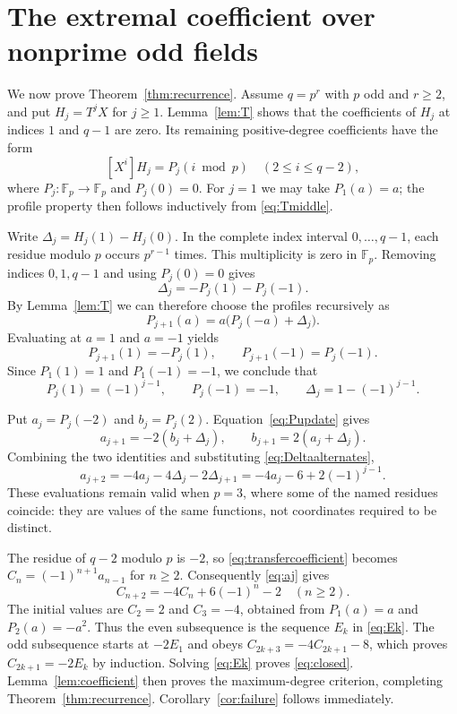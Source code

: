 \documentclass[11pt]{article}
\theoremstyle{remark}\newtheorem{remark}[theorem]{Remark}
\newcommand{\F}{\mathbb F}
\begin{document}
\section{The extremal coefficient over nonprime odd fields}

We now prove Theorem~\ref{thm:recurrence}. Assume $q=p^r$ with $p$ odd and
$r\geq2$, and put $H_j=T^jX$ for $j\geq1$.
Lemma~\ref{lem:T} shows that the coefficients of $H_j$ at indices $1$ and
$q-1$ are zero. Its remaining positive-degree coefficients have the form
\begin{equation}\label{eq:profile}
 [X^i]H_j=P_j(i\bmod p)\quad(2\leq i\leq q-2),
\end{equation}
where $P_j:\F_p\to\F_p$ and $P_j(0)=0$. For $j=1$ we may take $P_1(a)=a$;
the profile property then follows inductively from \eqref{eq:Tmiddle}.

Write $\Delta_j=H_j(1)-H_j(0)$. In the complete index interval
$0,\ldots,q-1$, each residue modulo $p$ occurs $p^{r-1}$ times. This multiplicity
is zero in $\F_p$. Removing indices $0,1,q-1$ and using $P_j(0)=0$ gives
\begin{equation}\label{eq:Deltaj}
 \Delta_j=-P_j(1)-P_j(-1).
\end{equation}
By Lemma~\ref{lem:T} we can therefore choose the profiles recursively as
\begin{equation}\label{eq:Pupdate}
 P_{j+1}(a)=a\bigl(P_j(-a)+\Delta_j\bigr).
\end{equation}
Evaluating at $a=1$ and $a=-1$ yields
\[
 P_{j+1}(1)=-P_j(1),\qquad P_{j+1}(-1)=P_j(-1).
\]
Since $P_1(1)=1$ and $P_1(-1)=-1$, we conclude that
\begin{equation}\label{eq:Deltaalternates}
 P_j(1)=(-1)^{j-1},\qquad P_j(-1)=-1,\qquad
 \Delta_j=1-(-1)^{j-1}.
\end{equation}

Put $a_j=P_j(-2)$ and $b_j=P_j(2)$. Equation~\eqref{eq:Pupdate} gives
\[
 a_{j+1}=-2(b_j+\Delta_j),\qquad
 b_{j+1}=2(a_j+\Delta_j).
\]
Combining the two identities and substituting \eqref{eq:Deltaalternates},
\begin{equation}\label{eq:aj}
 a_{j+2}=-4a_j-4\Delta_j-2\Delta_{j+1}
 =-4a_j-6+2(-1)^{j-1}.
\end{equation}
These evaluations remain valid when $p=3$, where some of the named residues
coincide: they are values of the same functions, not coordinates required to
be distinct.

The residue of $q-2$ modulo $p$ is $-2$, so
\eqref{eq:transfercoefficient} becomes $C_n=(-1)^{n+1}a_{n-1}$ for $n\geq2$.
Consequently \eqref{eq:aj} gives
\begin{equation}\label{eq:Crec}
 C_{n+2}=-4C_n+6(-1)^n-2\quad(n\geq2).
\end{equation}
The initial values are $C_2=2$ and $C_3=-4$, obtained from $P_1(a)=a$ and
$P_2(a)=-a^2$. Thus the even subsequence is the sequence $E_k$ in
\eqref{eq:Ek}. The odd subsequence starts at $-2E_1$ and obeys
$C_{2k+3}=-4C_{2k+1}-8$, which proves $C_{2k+1}=-2E_k$ by induction.
Solving \eqref{eq:Ek} proves \eqref{eq:closed}. Lemma~\ref{lem:coefficient}
then proves the maximum-degree criterion, completing
Theorem~\ref{thm:recurrence}. Corollary~\ref{cor:failure} follows immediately.
\end{document}
